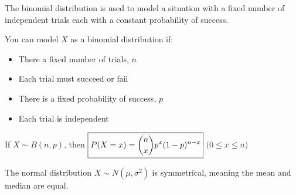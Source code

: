 \documentclass[../main.tex]{subfile}
\begin{document}


The binomial distribution is used to model a situation with a fixed number of independent trials each with a constant probability of success.

You can model $X$ as a binomial distribution if:
\begin{itemize}
	\item There a fixed number of trials, $n$
	\item Each trial must succeed or fail
	\item There is a fixed probability of success, $p$
	\item Each trial is independent
\end{itemize}

\begin{center}
	If $X \sim B(n, p)$, then $\boxed{P(X = x) = \binom{n}{x} p^x (1 - p)^{n - x}}\ \constraint{0 \leq x \leq n}$
\end{center}


The normal distribution $X \sim N(\mu, \sigma^2)$ is symmetrical, meaning the mean and median are equal.

\begin{figure}[h]
\begin{center}
\end{center}
\end{figure}
\end{document}
